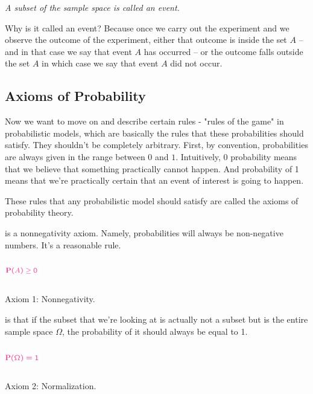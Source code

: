 \documentclass{tufte-handout}
\begin{document}
\vspace{0.5cm}
\emph{A subset of the sample space is called an event.}
\vspace{0.5cm}

Why is it called an event? Because once we carry out the experiment and we observe the outcome of the
experiment, either that outcome is inside the set $A$ -- and in that case we say that event $A$ has occurred -- or
the outcome falls outside the set $A$ in which case 
we say that event $A$ did not occur. 

\subsection{Axioms of Probability}\label{sec:probability-axioms}

Now we want to move on and describe certain rules - "rules of the game" in probabilistic models,
which are basically the rules that these probabilities should satisfy. They shouldn't be completely
arbitrary. First, by convention, probabilities are always given in the range between $0$ and $1$. Intuitively, $0$
probability means that we believe that something practically cannot happen. And probability of 1 means
that we're practically certain that an event of interest is going to happen.


These rules that any probabilistic model
should satisfy are called the axioms of probability theory. 

 is a nonnegativity axiom.
Namely, probabilities will always be non-negative numbers. It's a reasonable rule. 
\begin{marginfigure}
  \includegraphics[width=1.5cm, height=1cm]{Axiom1}
  \caption{Axiom 1: Nonnegativity.}
\end{marginfigure}

 is
that if the subset that we're looking at is actually not a subset but is the entire sample space $\Omega$, the
probability of it should always be equal to 1.
\begin{marginfigure}
  \includegraphics[width=1.5cm, height=1cm]{Axiom2}
  \caption{Axiom 2: Normalization.}
\end{marginfigure}
\end{document}
